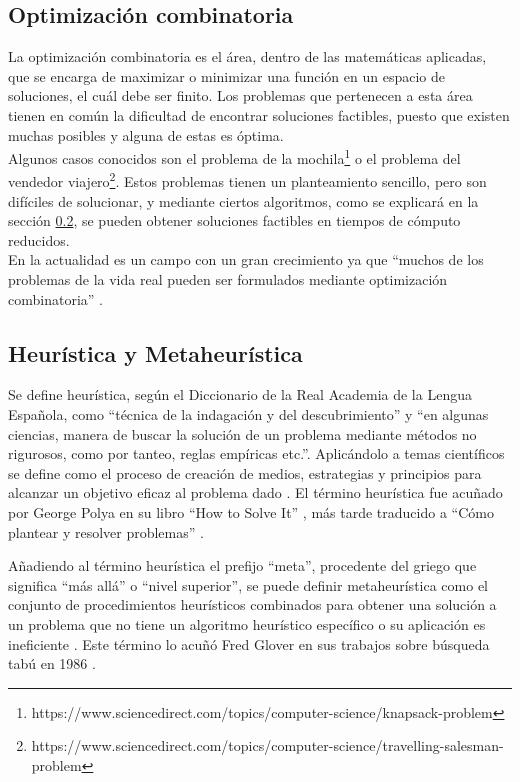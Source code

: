 \subsection{Optimización combinatoria}
La optimización combinatoria es el área, dentro de las matemáticas aplicadas, que se encarga de maximizar o minimizar una función en un espacio de soluciones, el cuál debe ser finito. Los problemas que pertenecen a esta área tienen en común la dificultad de encontrar soluciones factibles, puesto que existen muchas posibles y alguna de estas es óptima.\\
Algunos casos conocidos son el problema de la mochila\footnote{https://www.sciencedirect.com/topics/computer-science/knapsack-problem} o el problema del vendedor viajero\footnote{https://www.sciencedirect.com/topics/computer-science/travelling-salesman-problem}. Estos problemas tienen un planteamiento sencillo, pero son difíciles de solucionar, y mediante ciertos algoritmos, como se explicará en la sección \ref{sec:heu-meta}, se pueden obtener soluciones factibles en tiempos de cómputo reducidos.\\
En la actualidad es un campo con un gran crecimiento ya que ``muchos de los problemas de la vida real pueden ser formulados mediante optimización combinatoria'' \cite{opt-comb-rg}.

\subsection{Heurística y Metaheurística}
\label{sec:heu-meta}
Se define heurística, según el Diccionario de la Real Academia de la Lengua Española, como ``técnica de la indagación y del descubrimiento'' y ``en algunas ciencias, manera de buscar la solución de un problema mediante métodos no rigurosos, como por tanteo, reglas empíricas etc.''\cite{rae-heuristica}. Aplicándolo a temas científicos se define como el proceso de creación de medios, estrategias y principios para alcanzar un objetivo eficaz al problema dado \cite{conceptodef-heuristica}. El término heurística fue acuñado por George Polya en su libro ``How to Solve It'' \cite{gpolya-book-1}, más tarde traducido a ``Cómo plantear y resolver problemas'' \cite{gpolya-book-2}.

Añadiendo al término heurística el prefijo ``meta'', procedente del griego que significa ``más allá'' o ``nivel superior'', se puede definir metaheurística como el conjunto de procedimientos heurísticos combinados para obtener una solución a un problema que no tiene un algoritmo heurístico específico o su aplicación es ineficiente \cite{wiki-metaheuristica}. Este término lo acuñó Fred Glover en sus trabajos sobre búsqueda tabú en 1986 \cite{fred-glover}.

